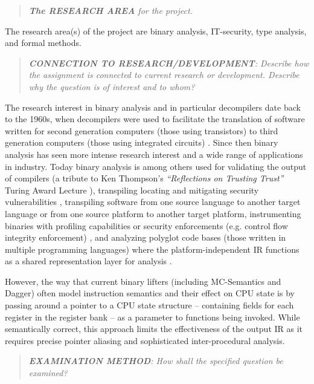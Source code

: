 \documentclass[12pt, a4paper]{article}
\begin{document}
\begin{quote}
	\textit{\textbf{The RESEARCH AREA} for the project.}
\end{quote}

The research area(s) of the project are binary analysis, IT-security, type analysis, and formal methods.

\begin{quote}
	\textit{\textbf{CONNECTION TO RESEARCH/DEVELOPMENT}: Describe how the assignment is connected to current research or development. Describe why the question is of interest and to whom?}
\end{quote}

The research interest in binary analysis and in particular decompilers date back to the 1960s, when decompilers were used to facilitate the translation of software written for second generation computers (those using transistors) to third generation computers (those using integrated circuits) \cite{reverse_compilation}. Since then binary analysis has seen more intense research interest and a wide range of applications in industry. Today binary analysis is among others used for validating the output of compilers (a tribute to Ken Thompson's \textit{``Reflections on Trusting Trust''} Turing Award Lecture \cite{trusting_trust}), transpiling locating and mitigating security vulnerabilities \cite{state_of_the_art_of_war}, transpiling software from one source language to another target language or from one source platform to another target platform, instrumenting binaries with profiling capabilities or security enforcements (e.g. control flow integrity enforcement) \cite{superset_disassembly}, and analyzing polyglot code bases (those written in multiple programming languages) where the platform-independent IR functions as a shared representation layer for analysis \cite{revgen}.

However, the way that current binary lifters (including MC-Semantics and Dagger) often model instruction semantics and their effect on CPU state is by passing around a pointer to a CPU state structure -- containing fields for each register in the register bank -- as a parameter to functions being invoked. While semantically correct, this approach limits the effectiveness of the output IR as it requires precise pointer aliasing and sophisticated inter-procedural analysis.


\begin{quote}
	\textit{\textbf{EXAMINATION METHOD}: How shall the specified question be examined?}
\end{quote}
\end{document}

